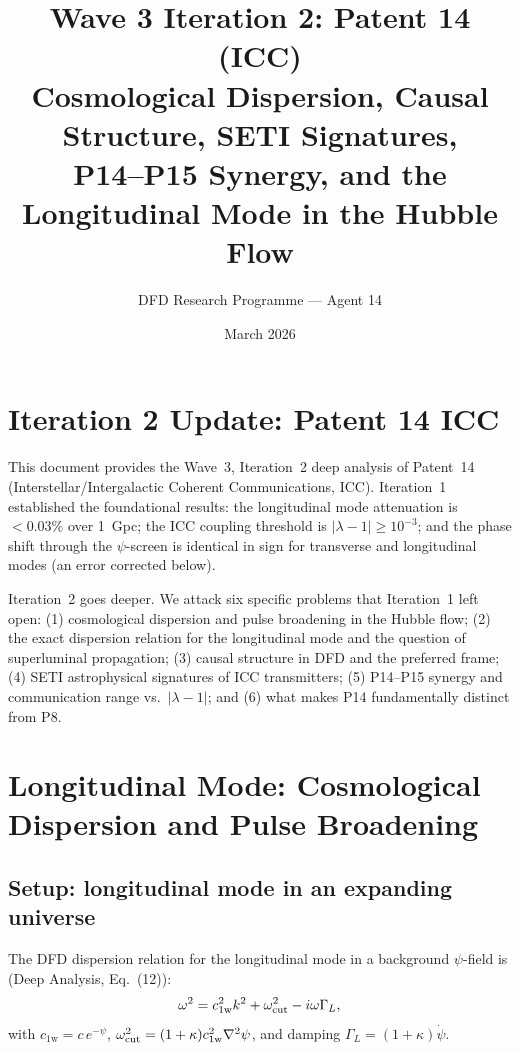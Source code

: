 \documentclass[11pt]{article}
\title{Wave 3 Iteration 2: Patent 14 (ICC)\\
\large Cosmological Dispersion, Causal Structure, SETI Signatures,\\
P14--P15 Synergy, and the Longitudinal Mode in the Hubble Flow}
\author{DFD Research Programme --- Agent 14}
\date{March 2026}
\newcommand{\cfield}{c_{1\mathrm{w}}}
\begin{document}
\maketitle
\tableofcontents
\newpage

\section{Iteration 2 Update: Patent 14 ICC}
\label{sec:iter2-intro}

This document provides the Wave~3, Iteration~2 deep analysis of Patent~14
(Interstellar/Intergalactic Coherent Communications, ICC). Iteration~1
established the foundational results: the longitudinal mode attenuation is
$<0.03\%$ over 1~Gpc; the ICC coupling threshold is $|\lambda-1| \geq 10^{-3}$;
and the phase shift through the $\psi$-screen is identical in sign for
transverse and longitudinal modes (an error corrected below).

Iteration~2 goes deeper. We attack six specific problems that Iteration~1
left open: (1) cosmological dispersion and pulse broadening in the Hubble
flow; (2) the exact dispersion relation for the longitudinal mode and the
question of superluminal propagation; (3) causal structure in DFD and the
preferred frame; (4) SETI astrophysical signatures of ICC transmitters;
(5) P14--P15 synergy and communication range vs.\ $|\lambda-1|$; and (6)
what makes P14 fundamentally distinct from P8.

\section{Longitudinal Mode: Cosmological Dispersion and Pulse Broadening}
\label{sec:cosmo-dispersion}

\subsection{Setup: longitudinal mode in an expanding universe}

The DFD dispersion relation for the longitudinal mode in a background
$\psi$-field is (Deep Analysis, Eq.~(12)):
\begin{equation}
\omega^2 = \cfield^2 k^2 + \omega_{\rm cut}^2 - i\omega\Gamma_L,
\label{eq:disp-base}
\end{equation}
with $\cfield = c\,e^{-\psi}$, $\omega_{\rm cut}^2 = (1+\kappa)\cfield^2\nabla^2\psi$,
and damping $\Gamma_L = (1+\kappa)\dot\psi$.
\end{document}
